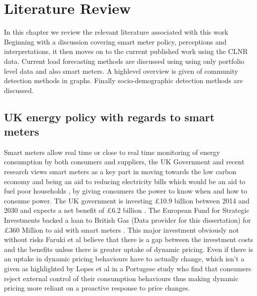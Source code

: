\chapter{Literature Review}
\label{Literature}

In this chapter we review the relevant literature associated with this work Beginning with a discussion covering smart meter policy, perceptions and interpretations, it then moves on to the current published work using the CLNR data. Current load forecasting methods are discussed using using only portfolio level data and also smart meters. A highlevel overview is given of community detection methods in graphs. Finally socio-demographic detection methods are discussed.

\section{UK energy policy with regards to smart meters}
Smart meters allow real time or close to real time monitoring of energy consumption by both consumers and suppliers, the UK Government and recent research views smart meters as a key part in moving towards the low carbon economy \cite{clastres2016} and being an aid to reducing electricity bills which would be an aid to fuel poor households  \cite{darby2012}, by giving consumers the power to know when and how to consume power.
The UK government is investing \pounds10.9 billion between 2014 and 2030 and expects a net benefit of \pounds6.2 billion \cite{smartmetersdiagnosisandplans}. The European Fund for Strategic Investments backed a loan to British Gas (Data provider for this dissertation) for \pounds360 Million to aid with smart meters \cite{primeministersoffice10downingstreet2016}. This major investment obviously not without risks Faruki et al \cite{faruqui2010} believe that there is a gap between the investment costs and the benefits unless there is greater uptake of dynamic pricing. Even if there is an uptake in dynamic pricing behaviours have to actually change, which isn't a given as highlighted by Lopes et al \cite{lopes2016} in a Portugese study who find that consumers reject external control of their consumption behaviours thus making dynamic pricing more reliant on a proactive response to price changes.

